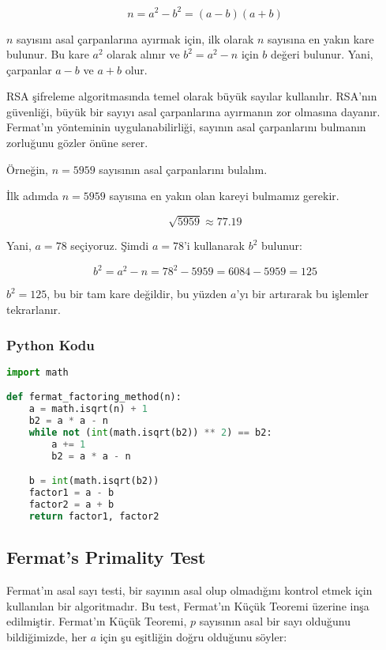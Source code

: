 \[ n = a^2 - b^2 = (a - b)(a + b) \]

$n$ sayısını asal çarpanlarına ayırmak için, ilk olarak $n$ sayısına en yakın kare bulunur. Bu kare $a^2$ olarak alınır ve $b^2 = a^2 - n$ için $b$ değeri bulunur. Yani, çarpanlar $a - b$ ve $a + b$ olur. 

RSA şifreleme algoritmasında temel olarak büyük sayılar kullanılır. RSA’nın güvenliği, büyük bir sayıyı asal çarpanlarına ayırmanın zor olmasına dayanır. Fermat’ın yönteminin uygulanabilirliği, sayının asal çarpanlarını bulmanın zorluğunu gözler önüne serer.

Örneğin, $n = 5959$ sayısının asal çarpanlarını bulalım.

İlk adımda $n = 5959$ sayısına en yakın olan kareyi bulmamız gerekir.

\[ \sqrt{5959} \approx 77.19 \]

Yani, $a = 78$ seçiyoruz. Şimdi $a = 78$'i kullanarak $b^2$ bulunur:

\[ b^2 = a^2 - n = 78^2 - 5959 = 6084 - 5959 = 125 \]

$b^2 = 125$, bu bir tam kare değildir, bu yüzden $a$'yı bir artırarak bu işlemler tekrarlanır.

\subsubsection{Python Kodu}

\begin{lstlisting}[language=Python]
import math

def fermat_factoring_method(n):
    a = math.isqrt(n) + 1
    b2 = a * a - n
    while not (int(math.isqrt(b2)) ** 2) == b2:
        a += 1
        b2 = a * a - n

    b = int(math.isqrt(b2))
    factor1 = a - b
    factor2 = a + b
    return factor1, factor2
\end{lstlisting}

\newpage

\subsection{Fermat's Primality Test}

Fermat'ın asal sayı testi, bir sayının asal olup olmadığını kontrol etmek için kullanılan bir algoritmadır. Bu test, Fermat'ın Küçük Teoremi üzerine inşa edilmiştir. Fermat'ın Küçük Teoremi, $p$ sayısının asal bir sayı olduğunu bildiğimizde, her $a$ için şu eşitliğin doğru olduğunu söyler:

